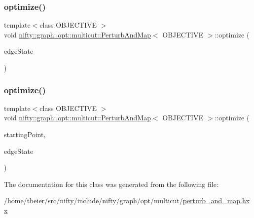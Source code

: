 \mbox{\label{classnifty_1_1graph_1_1opt_1_1multicut_1_1PerturbAndMap_afeb721d1af08fa11cee43463b949e911}} 
\subsubsection{\texorpdfstring{optimize()}{optimize()}\hspace{0.1cm}{\footnotesize\ttfamily [1/2]}}
{\footnotesize\ttfamily template$<$class O\+B\+J\+E\+C\+T\+I\+VE $>$ \\
void \hyperlink{classnifty_1_1graph_1_1opt_1_1multicut_1_1PerturbAndMap}{nifty\+::graph\+::opt\+::multicut\+::\+Perturb\+And\+Map}$<$ O\+B\+J\+E\+C\+T\+I\+VE $>$\+::optimize (\begin{DoxyParamCaption}\item[{\hyperlink{classnifty_1_1graph_1_1opt_1_1multicut_1_1PerturbAndMap_a82a5b6a74aac0c8bc47d5ccfbd06aaf2}{Edge\+State} \&}]{edge\+State }\end{DoxyParamCaption})}

\mbox{\label{classnifty_1_1graph_1_1opt_1_1multicut_1_1PerturbAndMap_ad5d4f689b41b573677862a2ed0764d40}} 
\subsubsection{\texorpdfstring{optimize()}{optimize()}\hspace{0.1cm}{\footnotesize\ttfamily [2/2]}}
{\footnotesize\ttfamily template$<$class O\+B\+J\+E\+C\+T\+I\+VE $>$ \\
void \hyperlink{classnifty_1_1graph_1_1opt_1_1multicut_1_1PerturbAndMap}{nifty\+::graph\+::opt\+::multicut\+::\+Perturb\+And\+Map}$<$ O\+B\+J\+E\+C\+T\+I\+VE $>$\+::optimize (\begin{DoxyParamCaption}\item[{const \hyperlink{classnifty_1_1graph_1_1opt_1_1multicut_1_1PerturbAndMap_a7ea0921a7e9ee7c29772d615a1f0de89}{Node\+Labels} \&}]{starting\+Point,  }\item[{\hyperlink{classnifty_1_1graph_1_1opt_1_1multicut_1_1PerturbAndMap_a82a5b6a74aac0c8bc47d5ccfbd06aaf2}{Edge\+State} \&}]{edge\+State }\end{DoxyParamCaption})}



The documentation for this class was generated from the following file\+:\begin{DoxyCompactItemize}
\item 
/home/tbeier/src/nifty/include/nifty/graph/opt/multicut/\hyperlink{perturb__and__map_8hxx}{perturb\+\_\+and\+\_\+map.\+hxx}\end{DoxyCompactItemize}
